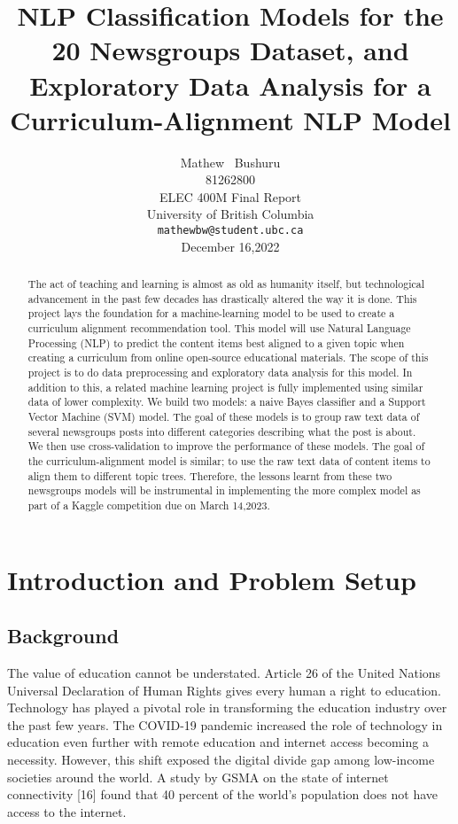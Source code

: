 \documentclass{article}
\title{
NLP Classification Models for the 20 Newsgroups Dataset, and Exploratory Data Analysis for a Curriculum-Alignment NLP Model  \\
}
\author{%
  Mathew ~Bushuru \\
  81262800\\
  ELEC 400M Final Report\\
  University of British Columbia\\ 
  \texttt{mathewbw@student.ubc.ca} \\
  December 16,2022\\
}
\begin{document}
\maketitle

\begin{abstract}
  The act of teaching and learning is almost as old as humanity itself, but technological advancement in the past few decades has drastically altered the way it is done. This project lays the foundation for a machine-learning model to be used to create a curriculum alignment recommendation tool. This model will use Natural Language Processing (NLP) to predict the content items best aligned to a given topic when creating a curriculum from online open-source educational materials. The scope of this project is to do data preprocessing and exploratory data analysis for this model. In addition to this, a related machine learning project is fully implemented using similar data of lower complexity. We build two models: a naive Bayes classifier and a Support Vector Machine (SVM) model. The goal of these models is to group raw text data of several newsgroups posts into different categories describing what the post is about. We then use cross-validation to improve the performance of these models. The goal of the curriculum-alignment model is similar; to use the raw text data of content items to align them to different topic trees. Therefore, the lessons learnt from these two newsgroups models will be instrumental in implementing the more complex model as part of a Kaggle competition due on March 14,2023.
\end{abstract}

\section{Introduction and Problem Setup}

\subsection{Background}
The value of education cannot be understated. Article 26 of the United Nations Universal Declaration of Human Rights gives every human a right to education. Technology has played a pivotal role in transforming the education industry over the past few years. The COVID-19 pandemic increased the role of technology in education even further with remote education and internet access becoming a necessity. However, this shift exposed the digital divide gap among low-income societies around the world. A study by GSMA on the state of internet connectivity [16] found that 40 percent of the world's population does not have access to the internet.
\end{document}
